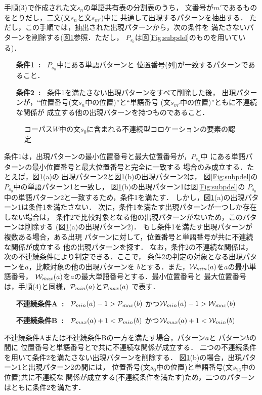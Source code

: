 手順(3)で作成された文$s_n$の単語共有表の分割表のうち，
文番号が$m'$であるものをとりだし，二文(文$s_n$と文$s_{m'}$)中に
共通して出現するパターンを抽出する．
ただし，この手順では，抽出された出現パターンから，次の条件を
満たさないパターンを削除する(図\ref{Fig:idenexam}参照．ただし，
$P_{s_0}$は図\ref{Fig:subpdel}のものを用いている)．
\begin{itemize}
\item[{\bf 条件1~:~}] $P_{s_n}$中にある単語パターンと
位置番号(列)が一致するパターンであること．
\item[{\bf 条件2~:~}] 条件1を満たさない出現パターンをすべて削除した後，
出現パターンが，``位置番号(文\hspace{-0.1mm}$s_n$\hspace{-0.1mm}中の位置)''と``単語番号
(文$s_{m'}$中の位置)''ともに不連続な関係が
成立する他の出現パターンを持つものであること．
\end{itemize}
\begin{figure}[hbt]
\begin{center}
\end{center}
\caption{コーパス$W$中の文$s_0$に含まれる不連続型コロケーションの要素の認定}
\label{Fig:idenexam}
\end{figure}

条件1は，出現パターンの最小位置番号と最大位置番号が，$P_{s_n}$中
にある単語パターンの最小位置番号と最大位置番号と完全に一致する
場合のみ成立する．たとえば，図\ref{Fig:idenexam}(a)の
出現パターン2と図\ref{Fig:idenexam}(b)の出現パターン2は，
図\ref{Fig:subpdel}の$P_{s_0}$中の単語パターン1と一致し，
図\ref{Fig:idenexam}(b)の出現パターン1は図\ref{Fig:subpdel}の
$P_{s_0}$中の単語パターン2と一致するため，条件1を満たす．
しかし，図\ref{Fig:idenexam}(a)の出現パターン1は条件1を満たさない．
次に，条件1を満たす出現パターンが一つしか存在しない場合は，
条件2で比較対象となる他の出現パターンがないため，このパターンは削除する
(図\ref{Fig:idenexam}(a)の出現パターン2)．
もし条件1を満たす出現パターンが複数ある場合，ある出現
パターンに対して，位置番号と単語番号が共に不連続な関係が成立する
他の出現パターンを探す．
なお，条件2の不連続な関係は，次の不連続条件により判定できる．ここで，
条件2の判定の対象となる出現パターンを$a$，比較対象の他の出現パターンを
$b$とする．また，${\cal W}_{min}(a)$を$a$の最小単語番号，
${\cal W}_{max}(a)$を$a$の最大単語番号とする．最小位置番号と
最大位置番号は，手順(4)と同様，${\cal P}_{min}(a)$と${\cal P}_{max}(a)$
で表す．
\begin{itemize}
\item[{\bf 不連続条件A~:~}] \({\cal P}_{min}(a)-1 > {\cal P}_{max}(b)\)
かつ\({\cal W}_{min}(a)-1 > {\cal W}_{max}(b)\)
\item[{\bf 不連続条件B~:~}] \({\cal P}_{max}(a)+1 < {\cal P}_{min}(b)\)
かつ\({\cal W}_{max}(a)+1 < {\cal W}_{min}(b)\)
\end{itemize}
不連続条件Aまたは不連続条件Bの一方を満たす場合，パターン$a$と
パターン$b$の間に
位置番号と単語番号とで共に不連続な関係が成立する．
二つの不連続条件を用いて条件2を満たさない出現パターンを削除する．
図\ref{Fig:idenexam}(b)の場合，出現パターン1と出現パターン2の間には，
位置番号(文$s_0$中の位置)と単語番号(文$s_{73}$中の位置)共に不連続な
関係が成立する(不連続条件を満たす)ため，二つのパターンはともに条件2を満たす．

